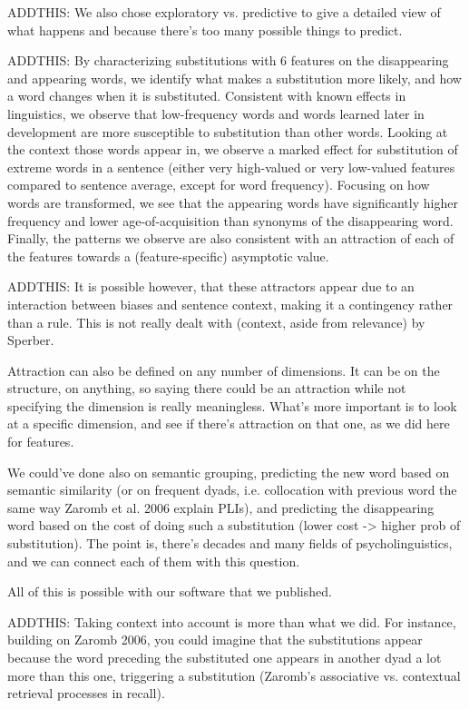 \begin{new}

ADDTHIS:
We also chose exploratory vs. predictive to give a detailed view of what happens and because there's too many possible things to predict.

ADDTHIS:
By characterizing substitutions with 6 features on the disappearing and appearing words, we identify what makes a substitution more likely, and how a word changes when it is substituted.
Consistent with known effects in linguistics, we observe that low-frequency words and words learned later in development are more susceptible to substitution than other words.
Looking at the context those words appear in, we observe a marked effect for substitution of extreme words in a sentence (either very high-valued or very low-valued features compared to sentence average, except for word frequency).
Focusing on how words are transformed, we see that the appearing words have significantly higher frequency and lower age-of-acquisition than synonyms of the disappearing word.
Finally, the patterns we observe are also consistent with an attraction of each of the features towards a (feature-specific) asymptotic value.

ADDTHIS:
It is possible however, that these attractors appear due to an interaction between biases and sentence context, making it a contingency rather than a rule. This is not really dealt with (context, aside from relevance) by Sperber.

Attraction can also be defined on any number of dimensions. It can be on the structure, on anything, so saying there could be an attraction while not specifying the dimension is really meaningless. What's more important is to look at a specific dimension, and see if there's attraction on that one, as we did here for features.

We could've done also on semantic grouping, predicting the new word based on semantic similarity (or on frequent dyads, i.e. collocation with previous word the same way Zaromb et al. 2006 explain PLIs), and predicting the disappearing word based on the cost of doing such a substitution (lower cost -> higher prob of substitution). The point is, there's decades and many fields of psycholinguistics, and we can connect each of them with this question.

All of this is possible with our software that we published.

ADDTHIS:
Taking context into account is more than what we did. For instance, building on Zaromb 2006, you could imagine that the substitutions appear because the word preceding the substituted one appears in another dyad a lot more than this one, triggering a substitution (Zaromb's associative vs. contextual retrieval processes in recall).


\end{new}
